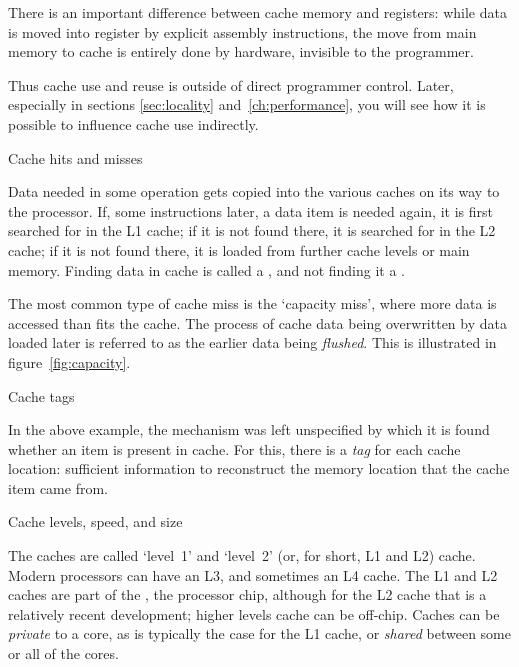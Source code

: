 There is an important difference between cache memory and registers:
while data is moved into register by explicit assembly instructions,
the move from main memory to cache is entirely done by hardware,
invisible to the programmer.


Thus
cache use and reuse is outside of direct programmer control.
Later, especially in sections \ref{sec:locality}
and~\ref{ch:performance}, you will see how it is possible to
influence cache use indirectly.

 {Cache hits and misses}


Data needed in some operation gets copied into the various
caches on its way to the processor.
If, some instructions later, a data item is needed again,
it is first searched for in the L1 cache;
if it is not found there, it is searched for in the L2 cache;
if it is not found there,
it is loaded from further cache levels or main memory.
Finding data in cache is called a
, and not finding it a .

The most common type of cache miss is the `capacity miss', where more data
is accessed than fits the cache.
The process of cache data being overwritten by data loaded later
is referred to as the earlier data being
\emph{flushed}.
This is illustrated in figure~\ref{fig:capacity}.


 {Cache tags}
\label{sec:cache-tag}

In the above example, the mechanism was left unspecified by which it is found whether an
item is present in cache. For this, there is a
%
\emph{tag}
for each cache location: sufficient information to reconstruct the
memory location that the cache item came from.

 {Cache levels, speed, and size}
\label{sec:cache-level}

The caches are called `level~1' and `level~2' (or, for short, L1 and
L2) cache.
Modern processors can have an L3, and sometimes an L4 cache.
The L1 and L2 caches
are part of the , the processor chip, although for the
L2 cache that is a relatively recent development;
higher levels cache can be off-chip.
Caches can be \emph{private} to a core,
as is typically the case for the L1 cache,
or \emph{shared} between some or all of the cores.

